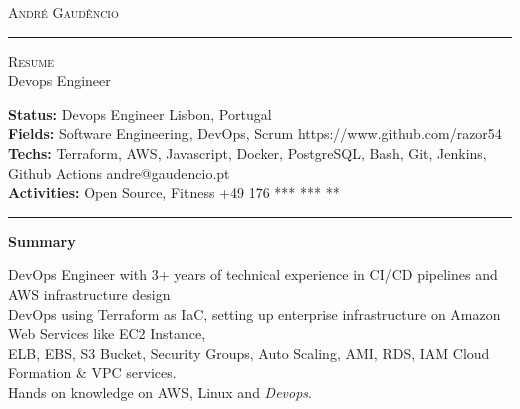 \documentclass[10pt,A4]{article}
\newcommand{\cvsection}[1]
{
	\begin{center}
		\large\textcolor{sectcol}{\textbf{#1}}
	\end{center}
}
\newcommand{\metasection}[2]
{
\footnotesize{#2} \hspace*{\fill} \footnotesize{#1}\\[1pt]
}
\begin{document}
\pagestyle{fancy}	








\vspace{-8pt}
\begin{center}
	\HUGE \textsc{André Gaudêncio} \textcolor{sectcol}{\rule[-1mm]{1mm}{0.9cm}} \textsc{Resume}\\[2pt]
	\small Devops Engineer
\end{center}



\vspace{6pt}


\metasection{Lisbon, Portugal}{\textbf{Status:} Devops Engineer}
\metasection{https://www.github.com/razor54}{\textbf{Fields:} Software Engineering, DevOps, Scrum} 
\metasection{andre@gaudencio.pt}{\textbf{Techs:} Terraform, AWS, Javascript, Docker, PostgreSQL, Bash, Git, Jenkins, Github Actions}
\metasection{+49 176 *** *** **}{\textbf{Activities:} Open Source, Fitness}
\vspace{-2pt}
\textcolor{softcol}{\hrule}
\vspace{6pt}

\normalsize

\vspace{-6pt}
\cvsection{Summary}
DevOps Engineer with 3+ years of technical experience in CI/CD pipelines and AWS infrastructure design\\
DevOps using Terraform as IaC, setting up enterprise infrastructure on Amazon Web Services like EC2 Instance,\\ ELB, EBS, S3 Bucket, Security Groups, Auto Scaling, AMI, RDS, IAM Cloud Formation & VPC services.\\
Hands on knowledge on AWS, Linux and \emph{Devops}.
\end{document}
